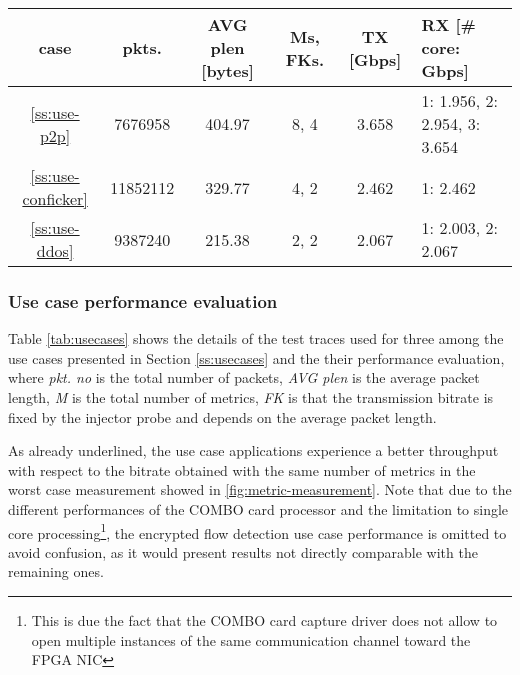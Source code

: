 \documentclass[conference,letterpaper]{sig-alternate-10pt}
\begin{document}
\begin{table*}
\hfill{}
\begin{center}
\begin{footnotesize}
\begin{tabular}{ | c | c | c | c | c | l |}
\hline
\textbf{case} & \textbf{pkts}. & \textbf{AVG plen [bytes]} & \textbf{Ms, FKs.}& \textbf{TX [Gbps]} & \textbf{RX [\# core: Gbps]}\\
\hline
\ref{ss:use-p2p} & 7676958 & 404.97 & 8, 4  & 3.658 & 1: 1.956,  2: 2.954,  3: 3.654\\
\hline
\ref{ss:use-conficker} & 11852112 & 329.77 & 4, 2 & 2.462 & 1: 2.462 \\
\hline
\ref{ss:use-ddos} & 9387240 & 215.38 & 2, 2 & 2.067 & 1: 2.003, 2: 2.067\\
\hline
\end{tabular}
\caption{Use case trace parameters and throughput}
\vspace*{-.5cm}
\label{tab:usecases}
\end{footnotesize}
\end{center}
\end{table*}

\subsubsection{Use case performance evaluation}
\label{ss:use-perf}
Table \ref{tab:usecases} shows the details of the test traces used for three among the use cases presented in Section \ref{ss:usecases} and the their performance evaluation, where \emph{pkt. no} is the total number of packets, \emph{AVG plen} is the average packet length, \emph{M} is the total number of metrics, \emph{FK} is that the transmission bitrate is fixed by the injector probe and depends on the average packet length. 

As already underlined, the use case applications experience a better throughput with respect to the bitrate obtained with the same number of metrics in the worst case measurement showed in \ref{fig:metric-measurement}. Note that due to the different performances of the COMBO card processor and the limitation to single core processing\footnote{This is due the fact that the COMBO card capture driver does not allow to open multiple instances of the same communication channel toward the FPGA NIC}, the encrypted flow detection use case performance is omitted to avoid confusion, as it would present results not directly comparable with the remaining ones. 
\end{document}
